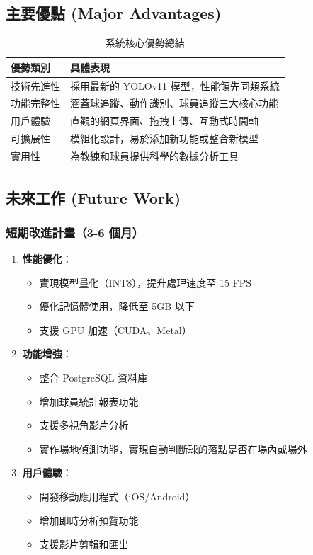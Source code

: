 \documentclass[a4paper,14pt,oneside]{article}
\begin{document}
\subsection{主要優點 (Major Advantages)}

\begin{table}[H]
    \centering
    \caption{系統核心優勢總結}
    \begin{tabular}{|l|p{10cm}|}
        \hline
        \textbf{優勢類別} & \textbf{具體表現} \\
        \hline
        技術先進性 & 採用最新的 YOLOv11 模型，性能領先同類系統 \\
        \hline
        功能完整性 & 涵蓋球追蹤、動作識別、球員追蹤三大核心功能 \\
        \hline
        用戶體驗 & 直觀的網頁界面、拖拽上傳、互動式時間軸 \\
        \hline
        可擴展性 & 模組化設計，易於添加新功能或整合新模型 \\
        \hline
        實用性 & 為教練和球員提供科學的數據分析工具 \\
        \hline
    \end{tabular}
\end{table}

\subsection{未來工作 (Future Work)}

\subsubsection{短期改進計畫（3-6 個月）}
\begin{enumerate}
    \item \textbf{性能優化}：
    \begin{itemize}
        \item 實現模型量化（INT8），提升處理速度至 15 FPS
        \item 優化記憶體使用，降低至 5GB 以下
        \item 支援 GPU 加速（CUDA、Metal）
    \end{itemize}
    
    \item \textbf{功能增強}：
    \begin{itemize}
        \item 整合 PostgreSQL 資料庫
        \item 增加球員統計報表功能
        \item 支援多視角影片分析
        \item 實作場地偵測功能，實現自動判斷球的落點是否在場內或場外
    \end{itemize}
    
    \item \textbf{用戶體驗}：
    \begin{itemize}
        \item 開發移動應用程式（iOS/Android）
        \item 增加即時分析預覽功能
        \item 支援影片剪輯和匯出
    \end{itemize}
\end{enumerate}
\end{document}
